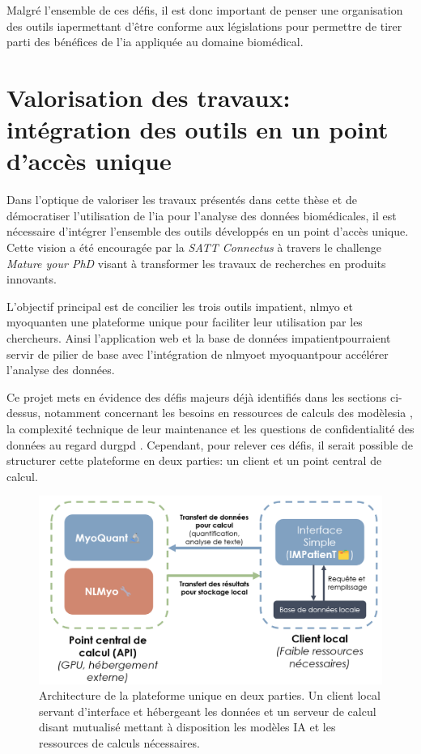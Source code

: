 Malgré l'ensemble de ces défis, il est donc important de penser une organisation des outils  \gls{ia}permettant d'être conforme aux législations pour permettre de tirer parti des bénéfices de l'\gls{ia} appliquée au domaine biomédical.

\section{Valorisation des travaux: intégration des outils en un point d'accès unique}
Dans l'optique de valoriser les travaux présentés dans cette thèse et de démocratiser l'utilisation de l’\gls{ia} pour l'analyse des données biomédicales, il est nécessaire d'intégrer l'ensemble des outils développés en un point d'accès unique. Cette vision a été encouragée par la \textit{SATT Connectus} à travers le challenge \textit{Mature your PhD} visant à transformer les travaux de recherches en produits innovants.

L'objectif principal est de concilier les trois outils \gls{impatient}, \gls{nlmyo} et  \gls{myoquant}en une plateforme unique pour faciliter leur utilisation par les chercheurs. Ainsi l'application web et la base de données  \gls{impatient}pourraient servir de pilier de base avec l'intégration de  \gls{nlmyo}et  \gls{myoquant}pour accélérer l'analyse des données.

Ce projet mets en évidence des défis majeurs déjà identifiés dans les sections ci-dessus, notamment concernant les besoins en ressources de calculs des modèles\gls{ia} , la complexité technique de leur maintenance et les questions de confidentialité des données au regard du\gls{rgpd} . Cependant, pour relever ces défis, il serait possible de structurer cette plateforme en deux parties: un client et un point central de calcul.
 \begin{figure}[!ht]
 \centering
 \includegraphics[width=1\textwidth]{figures/perspective_unique.png}
 \caption[Architecture de la plateforme unique en deux parties]{Architecture de la plateforme unique en deux parties. Un client local servant d'interface et hébergeant les données et un serveur de calcul disant mutualisé mettant à disposition les modèles IA et les ressources de calculs nécessaires.}
 \label{fig:perspective_unique}
\end{figure}

